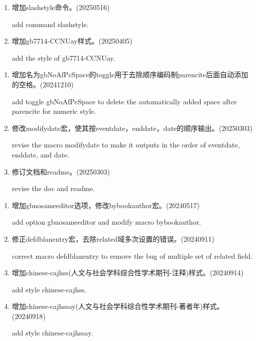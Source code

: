 


\begin{enumerate}

\item 增加slashstyle命令。(20250516)

add command slashstyle.

\item 增加gb7714-CCNUay样式。(20250405)

add the style of gb7714-CCNUay.

\end{enumerate}


\label{up:20250303}
\begin{enumerate}

\item 增加名为gbNoAfPcSpace的toggle用于去除顺序编码制parencite后面自动添加的空格。(20241210)

add toggle gbNoAfPcSpace to delete the automatically added space after parencite for numeric style.

\item 修改modifydate宏，使其按eventdate，enddate，date的顺序输出。(20250303)

revise the macro modifydate to make it outputs in the order of  eventdate, enddate, and date.

\item 修订文档和readme。(20250303)

revise the doc and readme.
\end{enumerate}


\label{up:20241115}
\begin{enumerate}

\item 增加gbnosameeditor选项，修改bybookauthor宏。(20240517)

add option gbnosameeditor and modify macro bybookauthor.

\item 修正defdblanentry宏，去除related域多次设置的错误。(20240911)

correct macro defdblanentry to remove the bug of multiple set of related field.

\item 增加chinese-cajhss(人文与社会学科综合性学术期刊-注释)样式。(20240914)

add style chinese-cajhss.

\item 增加chinese-cajhssay(人文与社会学科综合性学术期刊-著者年)样式。(20240918)

add style chinese-cajhssay.

\end{enumerate}



